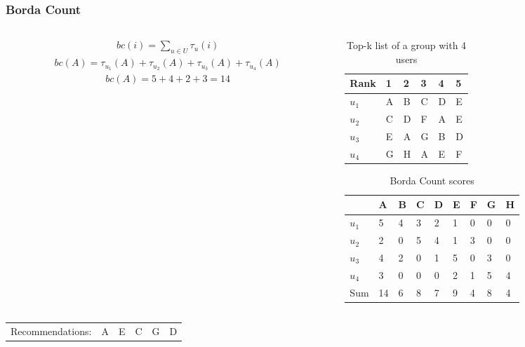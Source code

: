 \begin{frame}[t]
\frametitle{Borda Count}
\begin{columns}
\begin{column}{0.5\textwidth}
\begin{align*}
	bc(i) = \sum_{u\in U} \tau_u(i)
\end{align*}
\small
\begin{align*}
	bc(A) = \tau_{u_1}(A) + \tau_{u_2}(A) + \tau_{u_3}(A) + \tau_{u_4}(A)
\end{align*}
\normalsize
\begin{align*}
	bc(A) = 5 + 4 + 2 + 3 = 14
\end{align*}

\end{column}
\begin{column}{0.5\textwidth}
\small
\vspace{-0.5cm}
\begin{table}
\captionsetup{font=footnotesize}
\begin{tabular}{|l|lllll|} \hline
Rank  & 1 & 2 & 3 & 4 & 5 \\\hline
$u_1$ & A & B & C & D & E \\
$u_2$ & C & D & F & A & E \\
$u_3$ & E & A & G & B & D \\
$u_4$ & G & H & A & E & F\\\hline
\end{tabular}
\caption{Top-k list of a group with 4 users}
\end{table}

\vspace{-1cm}
\begin{table}
\begin{tabular}{|l|llllllll|}\hline
      & A & B & C & D & E & F & G & H \\\hline
$u_1$ & 5 & 4 & 3 & 2 & 1 & 0 & 0 & 0 \\
$u_2$ & 2 & 0 & 5 & 4 & 1 & 3 & 0 & 0 \\
$u_3$ & 4 & 2 & 0 & 1 & 5 & 0 & 3 & 0 \\
$u_4$ & 3 & 0 & 0 & 0 & 2 & 1 & 5 & 4 \\\hline
Sum	  & 14& 6 & 8 & 7 & 9 & 4 & 8 & 4 \\\hline
\end{tabular}
\caption{Borda Count scores}
\end{table}
\normalsize
\end{column}
\end{columns}
\begin{table}
\begin{tabular}{llllll}
Recommendations: & A & E & C & G & D
\end{tabular}
\end{table}
\end{frame}

%
%
%
